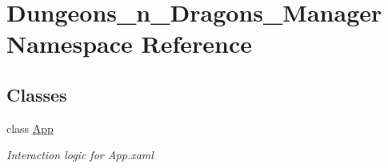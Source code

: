 \hypertarget{namespace_dungeons__n___dragons___manager}{}\section{Dungeons\+\_\+n\+\_\+\+Dragons\+\_\+\+Manager Namespace Reference}
\label{namespace_dungeons__n___dragons___manager}
\subsection*{Classes}
\begin{DoxyCompactItemize}
\item 
class \mbox{\hyperlink{class_dungeons__n___dragons___manager_1_1_app}{App}}
\begin{DoxyCompactList}\small\item\em Interaction logic for App.\+xaml \end{DoxyCompactList}\end{DoxyCompactItemize}
